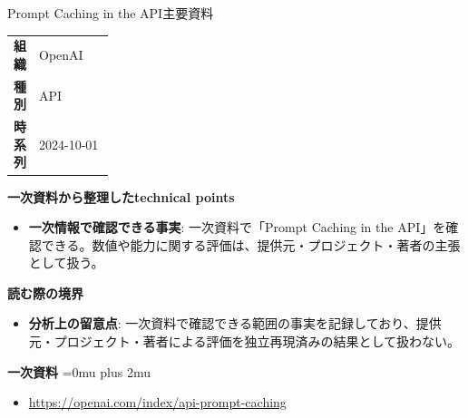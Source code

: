 \begin{technicalnote}{Prompt Caching in the API}{主要資料}
\begingroup
\begin{tabularx}{\linewidth}{@{}>{\bfseries}p{0.22\linewidth}X@{}}
組織 & OpenAI \\
種別 & API \\
時系列 & 2024-10-01 \\
\end{tabularx}
\smallskip
{\bfseries 一次資料から整理したtechnical points}
\begin{itemize}[leftmargin=1.5em,itemsep=0.35em]
\item \textbf{一次情報で確認できる事実}: 一次資料で「Prompt Caching in the API」を確認できる。数値や能力に関する評価は、提供元・プロジェクト・著者の主張として扱う。
\end{itemize}
\begin{minipage}{\linewidth}
{\bfseries 読む際の境界}
\begin{itemize}[leftmargin=1.5em,itemsep=0.35em]
\item \textbf{分析上の留意点}: 一次資料で確認できる範囲の事実を記録しており、提供元・プロジェクト・著者による評価を独立再現済みの結果として扱わない。
\end{itemize}
\begin{samepage}
{\bfseries 一次資料}
\begingroup\sloppy
\Urlmuskip=0mu plus 2mu\relax
\begin{itemize}[leftmargin=1.5em,itemsep=0.25em]
\item {\scriptsize\url{https://openai.com/index/api-prompt-caching}}
\end{itemize}
\endgroup
\end{samepage}
\end{minipage}
\endgroup
\end{technicalnote}
\medskip


